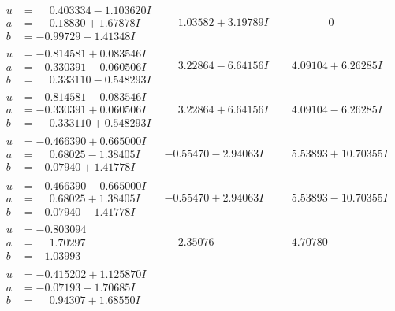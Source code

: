 \documentclass[1p]{elsarticle_modified}
\theoremstyle{definition}
\begin{document}
$$\begin{array}{c|c|c}
\begin{aligned}
u &= \phantom{-}0.403334 - 1.103620 I \\
a &= \phantom{-}0.18830 + 1.67878 I \\
b &= -0.99729 - 1.41348 I\end{aligned}
 & \phantom{-}1.03582 + 3.19789 I & \phantom{-0.000000 } 0 \\ \hline\begin{aligned}
u &= -0.814581 + 0.083546 I \\
a &= -0.330391 - 0.060506 I \\
b &= \phantom{-}0.333110 - 0.548293 I\end{aligned}
 & \phantom{-}3.22864 - 6.64156 I & \phantom{-}4.09104 + 6.26285 I \\ \hline\begin{aligned}
u &= -0.814581 - 0.083546 I \\
a &= -0.330391 + 0.060506 I \\
b &= \phantom{-}0.333110 + 0.548293 I\end{aligned}
 & \phantom{-}3.22864 + 6.64156 I & \phantom{-}4.09104 - 6.26285 I \\ \hline\begin{aligned}
u &= -0.466390 + 0.665000 I \\
a &= \phantom{-}0.68025 - 1.38405 I \\
b &= -0.07940 + 1.41778 I\end{aligned}
 & -0.55470 - 2.94063 I & \phantom{-}5.53893 + 10.70355 I \\ \hline\begin{aligned}
u &= -0.466390 - 0.665000 I \\
a &= \phantom{-}0.68025 + 1.38405 I \\
b &= -0.07940 - 1.41778 I\end{aligned}
 & -0.55470 + 2.94063 I & \phantom{-}5.53893 - 10.70355 I \\ \hline\begin{aligned}
u &= -0.803094\phantom{ +0.000000I} \\
a &= \phantom{-}1.70297\phantom{ +0.000000I} \\
b &= -1.03993\phantom{ +0.000000I}\end{aligned}
 & \phantom{-}2.35076\phantom{ +0.000000I} & \phantom{-}4.70780\phantom{ +0.000000I} \\ \hline\begin{aligned}
u &= -0.415202 + 1.125870 I \\
a &= -0.07193 - 1.70685 I \\
b &= \phantom{-}0.94307 + 1.68550 I\end{aligned}

\end{array}$$
\end{document}
